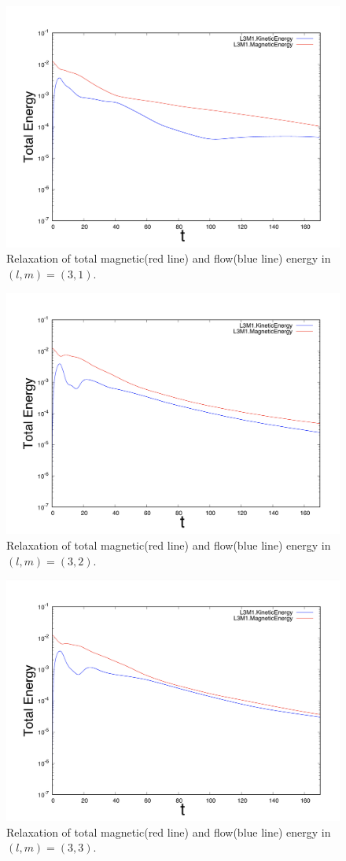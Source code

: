 \documentclass[12pt]{jsarticle}
\begin{document}
\begin{figure}[H]
\centering
\includegraphics[height=0.5\textheight,width=0.7\hsize,angle=0,keepaspectratio]{./Image/L3M1_graph2.png}
\caption{Relaxation of total magnetic(red line) and flow(blue line) energy in $(l,m)=(3,1)$.} \label{L3M1_graph}
\end{figure}
\begin{figure}[H]
\centering
\includegraphics[height=0.5\textheight,width=0.7\hsize,angle=0,keepaspectratio]{./Image/L3M2_graph2.png}
\caption{Relaxation of total magnetic(red line) and flow(blue line) energy in $(l,m)=(3,2)$.} \label{L3M2_graph}
\end{figure}
\begin{figure}[H]
\centering
\includegraphics[height=0.5\textheight,width=0.7\hsize,angle=0,keepaspectratio]{./Image/L3M3_graph2.png}
\caption{Relaxation of total magnetic(red line) and flow(blue line) energy in $(l,m)=(3,3)$.} \label{L3M3_graph}
\end{figure}
\end{document}
